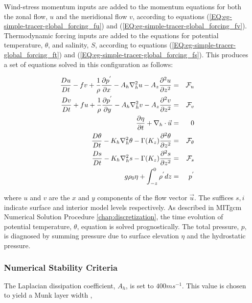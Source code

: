 Wind-stress momentum inputs are added to the momentum equations for both
the zonal flow, $u$ and the meridional flow $v$, according to equations 
(\ref{EQ:eg-simple-tracer-global_forcing_fu}) and (\ref{EQ:eg-simple-tracer-global_forcing_fv}).
Thermodynamic forcing inputs are added to the equations for
potential temperature, $\theta$, and salinity, $S$, according to equations 
(\ref{EQ:eg-simple-tracer-global_forcing_ft}) and (\ref{EQ:eg-simple-tracer-global_forcing_fs}).
This produces a set of equations solved in this configuration as follows:


\begin{eqnarray}
\label{EQ:eg-simple-tracer-model_equations}
\frac{Du}{Dt} - fv + 
  \frac{1}{\rho}\frac{\partial p^{'}}{\partial x} - 
  A_{h}\nabla_{h}^2u - A_{z}\frac{\partial^{2}u}{\partial z^{2}} 
& = &
{\cal F}_{u}
\\
\frac{Dv}{Dt} + fu + 
  \frac{1}{\rho}\frac{\partial p^{'}}{\partial y} - 
  A_{h}\nabla_{h}^2v - A_{z}\frac{\partial^{2}v}{\partial z^{2}} 
& = &
{\cal F}_{v}
\\
\frac{\partial \eta}{\partial t} + \nabla_{h}\cdot \vec{u}
&=&
0
\\
\frac{D\theta}{Dt} -
 K_{h}\nabla_{h}^2\theta  - \Gamma(K_{z})\frac{\partial^{2}\theta}{\partial z^{2}} 
& = &
{\cal F}_{\theta}
\\
\frac{D s}{Dt} -
 K_{h}\nabla_{h}^2 s  - \Gamma(K_{z})\frac{\partial^{2} s}{\partial z^{2}} 
& = &
{\cal F}_{s}
\\
g\rho_{0} \eta + \int^{0}_{-z}\rho^{'} dz & = & p^{'}
\\
\end{eqnarray}

\noindent where $u$ and $v$ are the $x$ and $y$ components of the
flow vector $\vec{u}$. The suffices ${s},{i}$ indicate surface and
interior model levels respectively. As described in
MITgcm Numerical Solution Procedure \ref{chap:discretization}, the time 
evolution of potential temperature, $\theta$, equation is solved prognostically.
The total pressure, $p$, is diagnosed by summing pressure due to surface 
elevation $\eta$ and the hydrostatic pressure.
\\

\subsubsection{Numerical Stability Criteria}
\label{www:tutorials}

The Laplacian dissipation coefficient, $A_{h}$, is set to $400 m s^{-1}$.
This value is chosen to yield a Munk layer width \cite{adcroft:95},


